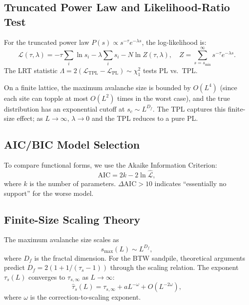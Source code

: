 \documentclass[preprint,12pt]{elsarticle}
\begin{document}
\subsection{Truncated Power Law and Likelihood-Ratio Test}

For the truncated power law $P(s)\propto s^{-\tau}e^{-\lambda s}$,
the log-likelihood is:
\begin{equation}
  \mathcal{L}(\tau,\lambda) =
  -\tau\sum_i\ln s_i - \lambda\sum_i s_i
  - N\ln Z(\tau,\lambda),\quad
  Z = \sum_{s=s_\mathrm{min}}^{\infty}s^{-\tau}e^{-\lambda s}.
  \label{eq:tpl}
\end{equation}
The LRT statistic $\Lambda=2(\mathcal{L}_\mathrm{TPL}-\mathcal{L}_\mathrm{PL})\sim\chi^2_1$
tests PL vs.\ TPL.

On a finite lattice, the maximum avalanche size is bounded by $O(L^4)$
(since each site can topple at most $O(L^2)$ times in the worst case),
and the true distribution has an exponential cutoff at
$s_c\sim L^{D_f}$.
The TPL captures this finite-size effect; as $L\to\infty$,
$\lambda\to0$ and the TPL reduces to a pure PL.

\subsection{AIC/BIC Model Selection}

To compare functional forms, we use the Akaike Information Criterion:
\begin{equation}
  \mathrm{AIC} = 2k - 2\ln\hat{\mathcal{L}},
  \label{eq:aic}
\end{equation}
where $k$ is the number of parameters.
$\Delta\mathrm{AIC}>10$ indicates ``essentially no support'' for the
worse model.

\subsection{Finite-Size Scaling Theory}

The maximum avalanche size scales as
\begin{equation}
  s_\mathrm{max}(L) \sim L^{D_f},
  \label{eq:fss_smax}
\end{equation}
where $D_f$ is the fractal dimension.
For the BTW sandpile, theoretical arguments predict
$D_f = 2(1 + 1/(\tau_s - 1))$ through the scaling relation.
The exponent $\tau_s(L)$ converges to $\tau_{s,\infty}$ as
$L\to\infty$:
\begin{equation}
  \hat\tau_s(L) = \tau_{s,\infty} + aL^{-\omega} + O(L^{-2\omega}),
  \label{eq:fss_tau}
\end{equation}
where $\omega$ is the correction-to-scaling exponent.
\end{document}
